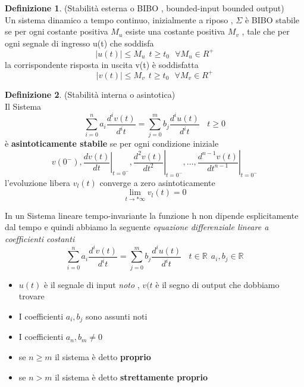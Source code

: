 \documentclass{article}
\theoremstyle{definition}
\newtheorem*{definizione}{Definizione}
\newcommand{\R}{\mathbb{R}}
\begin{document}
\begin{definizione}(Stabilità esterna o BIBO , bounded-input bounded output)\\
Un sistema dinamico a tempo continuo,  inizialmente a riposo  , $\Sigma$ è BIBO stabile se per ogni costante positiva $M_u$ esiste una costante positiva $M_v$ , tale che per ogni segnale di ingresso u(t) che soddisfa 
$$|u(t)|\leq M_u \ \  t \geq t_0\ \ \ \forall M_u \in R^{+} $$
la corrispondente risposta in uscita v(t) è soddisfatta 
$$|v(t)|\leq M_v \ \  t \geq t_0\ \ \ \forall M_v \in R^{+} $$
\end{definizione}
\begin{definizione}(Stabilità interna o asintotica)\\
	Il Sistema $$\sum_{i=0}^{n}a_i \frac{d^i v(t)}{d^it}=\sum_{j=0}^{m}b_j \frac{d^i u(t)}{d^it}  \ \ \ \ t \geq 0	$$ è \textbf{asintoticamente stabile } se per ogni condizione iniziale $$v\left(0^{-}\right),\left.\frac{d v(t)}{d t}\right|_{t=0^{-}},\left.\frac{d^2 v(t)}{d t^2}\right|_{t=0^{-}}, \ldots,\left.\frac{d^{n-1} v(t)}{d t^{n-1}}\right|_{t=0^{-}}
	$$ l'evoluzione libera $v_l(t)$ converge a zero asintoticamente 
	$$\lim_{t \rightarrow *\infty }v_l(t)=0$$
\end{definizione}
\newpage
In un Sistema lineare tempo-invariante la funzione h non dipende esplicitamente dal tempo e quindi abbiamo la seguente \textit{equazione differenziale lineare a coefficienti costanti } 
$$\sum_{i=0}^{n}a_i \frac{d^i v(t)}{d^it}=\sum_{j=0}^{m}b_j \frac{d^i u(t)}{d^it}  \ \ \ \ t \in \R \ \ a_i,b_j \in \R	$$
\begin{itemize}
	\item $u(t)$ è il segnale di input \textit{noto} , $v(t$ è il segno di output che dobbiamo trovare 
	\item I coefficienti $a_i,b_j$ sono assunti noti 
	\item I coefficienti $a_n,b_m \neq 0$
	\item se $n \geq m$ il sistema è detto \textbf{proprio}
	\item se $n > m $ il sistema è detto \textbf{strettamente proprio }
\end{itemize}
\end{document}
